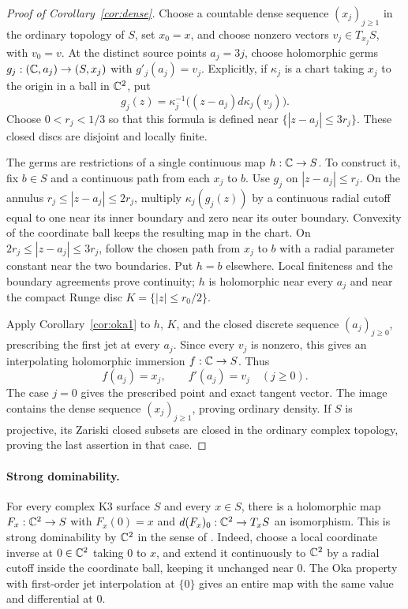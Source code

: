 \begin{proof}[Proof of Corollary~\ref{cor:dense}]
Choose a countable dense sequence $(x_j)_{j\geq1}$ in the ordinary
topology of $S$, set $x_0=x$, and choose nonzero vectors
$v_j\in T_{x_j}S$, with $v_0=v$.  At the distinct source points
$a_j=3j$, choose holomorphic germs $g_j:(\mathbb C,a_j)\to(S,x_j)$
with $g'_j(a_j)=v_j$.  Explicitly, if $\kappa_j$ is a chart taking
$x_j$ to the origin in a ball in $\mathbb C^2$, put
\[
 g_j(z)=\kappa_j^{-1}\bigl((z-a_j)d\kappa_j(v_j)\bigr).
\]
Choose $0<r_j<1/3$ so that this formula is defined near
$\{|z-a_j|\leq3r_j\}$.  These closed discs are disjoint and
locally finite.

The germs are restrictions of a single continuous map $h:\mathbb C\to S$.
To construct it, fix $b\in S$ and a continuous path from each
$x_j$ to $b$.  Use $g_j$ on $|z-a_j|\leq r_j$.  On the annulus
$r_j\leq|z-a_j|\leq2r_j$, multiply $\kappa_j(g_j(z))$ by a
continuous radial cutoff equal to one near its inner boundary and
zero near its outer boundary.  Convexity of the coordinate ball
keeps the resulting map in the chart.  On
$2r_j\leq|z-a_j|\leq3r_j$, follow the chosen path from $x_j$
to $b$ with a radial parameter constant near the two boundaries.
Put $h=b$ elsewhere.  Local finiteness and the boundary agreements
prove continuity; $h$ is holomorphic near every $a_j$ and near the
compact Runge disc $K=\{|z|\leq r_0/2\}$.

Apply Corollary~\ref{cor:oka1} to $h$, $K$,
and the closed discrete sequence $(a_j)_{j\geq0}$, prescribing the
first jet at every $a_j$.  Since every $v_j$ is nonzero, this gives
an interpolating holomorphic immersion $f:\mathbb C\to S$.  Thus
\[
 f(a_j)=x_j,\qquad f'(a_j)=v_j\quad(j\geq0).
\]
The case $j=0$ gives the prescribed point and exact tangent vector.
The image contains the dense sequence $(x_j)_{j\geq1}$, proving
ordinary density. If $S$ is projective, its Zariski closed subsets are
closed in the ordinary complex topology, proving the last assertion in
that case.
\end{proof}

\paragraph{Strong dominability.}
For every complex K3 surface $S$ and every $x\in S$, there is a
holomorphic map $F_x:\mathbb C^2\to S$ with $F_x(0)=x$ and
$d(F_x)_0:\mathbb C^2\to T_xS$ an isomorphism. This is strong dominability
by $\mathbb C^2$ in the sense of
\cite[Definition~1]{ForstnericLarussonSurfaces}.
Indeed, choose a local coordinate inverse at $0\in\mathbb C^2$ taking $0$ to
$x$, and extend it continuously to $\mathbb C^2$ by a radial cutoff inside
the coordinate ball, keeping it unchanged near $0$. The Oka property
with first-order jet interpolation at $\{0\}$
\cite[Proposition~1.2 and Corollary~1.3]{ForstnericInterpolation}
gives an entire map with the same value and differential at $0$.


